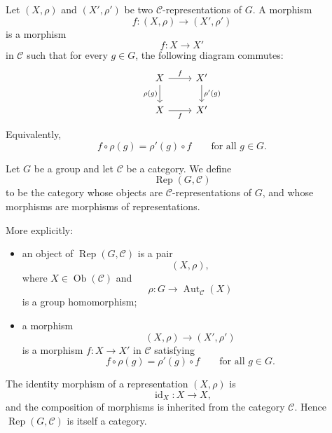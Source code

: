 \begin{definition}
    Let \((X,\rho)\) and \((X',\rho')\) be two
    \(\mathcal{C}\)-representations of \(G\).
    A morphism
    \[
        f:(X,\rho)\longrightarrow (X',\rho')
    \]
    is a morphism
    \[
        f:X\longrightarrow X'
    \]
    in \(\mathcal{C}\) such that for every \(g\in G\), the following diagram
    commutes:
    \[
    \begin{tikzcd}
        X \arrow[r,"f"] \arrow[d,"\rho(g)"'] &
        X' \arrow[d,"\rho'(g)"] \\
        X \arrow[r,"f"'] &
        X'
    \end{tikzcd}
    \]
    Equivalently,
    \[
        f\circ \rho(g)=\rho'(g)\circ f
        \qquad
        \text{for all } g\in G.
    \]
\end{definition}

\begin{definition}
    Let \(G\) be a group and let \(\mathcal{C}\) be a category.
    We define
    \[
        \operatorname{Rep}(G,\mathcal{C})
    \]
    to be the category whose objects are \(\mathcal{C}\)-representations
    of \(G\), and whose morphisms are morphisms of representations.

    More explicitly:
    \begin{itemize}
        \item an object of \(\operatorname{Rep}(G,\mathcal{C})\) is a pair
        \[
            (X,\rho),
        \]
        where \(X\in \operatorname{Ob}(\mathcal{C})\) and
        \[
            \rho:G\to \operatorname{Aut}_{\mathcal{C}}(X)
        \]
        is a group homomorphism;

        \item a morphism
        \[
            (X,\rho)\longrightarrow (X',\rho')
        \]
        is a morphism \(f:X\to X'\) in \(\mathcal{C}\) satisfying
        \[
            f\circ \rho(g)=\rho'(g)\circ f
            \qquad
            \text{for all } g\in G.
        \]
    \end{itemize}
\end{definition}

\begin{remark}
    The identity morphism of a representation \((X,\rho)\) is
    \[
        \operatorname{id}_X:X\to X,
    \]
    and the composition of morphisms is inherited from the category
    \(\mathcal{C}\). Hence \(\operatorname{Rep}(G,\mathcal{C})\) is itself
    a category.
\end{remark}
